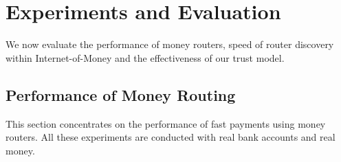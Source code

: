 

\section{Experiments and Evaluation}
We now evaluate the performance of money routers, speed of router discovery within Internet-of-Money and the effectiveness of our trust model.

\subsection{Performance of Money Routing}
This section concentrates on the performance of fast payments using money routers.
All these experiments are conducted with real bank accounts and real money.

